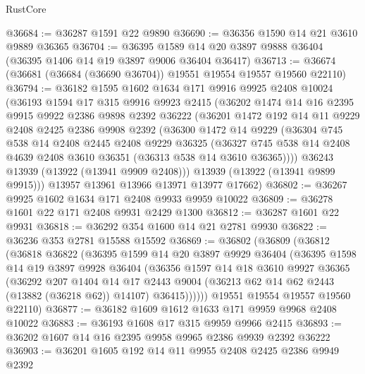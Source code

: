 \begin{lexlean}{RustCore}
\begin{coremodule}
@36684 := @36287 @1591 @22 @9890
@36690 := @36356 @1590 @14 @21 @3610 @9889 @36365
@36704 := @36395 @1589 @14 @20 @3897 @9888 @36404 (@36395 @1406 @14 @19 @3897 @9006 @36404 @36417)
@36713 := @36674 (@36681 (@36684 (@36690 @36704)) @19551 @19554 @19557 @19560 @22110)
@36794 := @36182
    @1595
    @1602
    @1634
    @171
    @9916
    @9925
    @2408
    @10024
    (@36193
      @1594
      @17
      @315
      @9916
      @9923
      @2415
      (@36202
        @1474
        @14
        @16
        @2395
        @9915
        @9922
        @2386
        @9898
        @2392
        @36222
        (@36201
          @1472
          @192
          @14
          @11
          @9229
          @2408
          @2425
          @2386
          @9908
          @2392
          (@36300
            @1472
            @14
            @9229
            (@36304
              @745
              @538
              @14
              @2408
              @2445
              @2408
              @9229
              @36325
              (@36327 @745 @538 @14 @2408 @4639 @2408 @3610 @36351 (@36313 @538 @14 @3610 @36365))))
          @36243
          @13939
          (@13922 (@13941 @9909 @2408)))
        @13939
        (@13922 (@13941 @9899 @9915)))
      @13957
      @13961
      @13966
      @13971
      @13977
      @17662)
@36802 := @36267 @9925 @1602 @1634 @171 @2408 @9933 @9959 @10022
@36809 := @36278 @1601 @22 @171 @2408 @9931 @2429 @1300
@36812 := @36287 @1601 @22 @9931
@36818 := @36292 @354 @1600 @14 @21 @2781 @9930
@36822 := @36236 @353 @2781 @15588 @15592
@36869 := @36802
    (@36809
      (@36812
        (@36818
          @36822
          (@36395
            @1599
            @14
            @20
            @3897
            @9929
            @36404
            (@36395
              @1598
              @14
              @19
              @3897
              @9928
              @36404
              (@36356
                @1597
                @14
                @18
                @3610
                @9927
                @36365
                (@36292
                  @207
                  @1404
                  @14
                  @17
                  @2443
                  @9004
                  (@36213 @62 @14 @62 @2443 (@13882 (@36218 @62)) @14107)
                  @36415))))))
      @19551
      @19554
      @19557
      @19560
      @22110)
@36877 := @36182 @1609 @1612 @1633 @171 @9959 @9968 @2408 @10022
@36883 := @36193 @1608 @17 @315 @9959 @9966 @2415
@36893 := @36202 @1607 @14 @16 @2395 @9958 @9965 @2386 @9939 @2392 @36222
@36903 := @36201 @1605 @192 @14 @11 @9955 @2408 @2425 @2386 @9949 @2392

\end{coremodule}
\end{lexlean}

